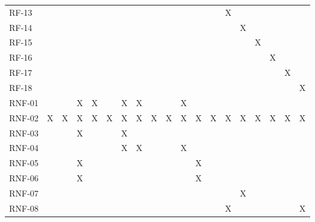 \begin{table}[H]
\begin{tabular}{@{}lC{0.42cm}C{0.42cm}C{0.42cm}C{0.42cm}C{0.42cm}C{0.42cm}C{0.42cm}C{0.42cm}C{0.42cm}C{0.42cm}C{0.42cm}C{0.42cm}C{0.42cm}C{0.42cm}C{0.42cm}C{0.42cm}C{0.42cm}C{0.42cm}@{}}
RF-13 &  &  &  &  &  &  &  &  &  &  &  &  & X &  &  &  &  &  \\
RF-14 &  &  &  &  &  &  &  &  &  &  &  &  &  & X &  &  &  &  \\
RF-15 &  &  &  &  &  &  &  &  &  &  &  &  &  &  & X &  &  &  \\
RF-16 &  &  &  &  &  &  &  &  &  &  &  &  &  &  &  & X &  &  \\
RF-17 &  &  &  &  &  &  &  &  &  &  &  &  &  &  &  &  & X &  \\
RF-18 &  &  &  &  &  &  &  &  &  &  &  &  &  &  &  &  &  & X \\
\midrule
RNF-01 &  &  & X & X &  & X & X &  &  & X &  &  &  &  &  &  &  &  \\
RNF-02 & X & X & X & X & X & X & X & X & X & X & X & X & X & X & X & X & X & X \\
RNF-03 &  &  & X &  &  & X &  &  &  &  &  &  &  &  &  &  &  &  \\
RNF-04 &  &  &  &  &  & X & X &  &  & X &  &  &  &  &  &  &  &  \\
RNF-05 &  &  & X &  &  &  &  &  &  &  & X &  &  &  &  &  &  &  \\
RNF-06 &  &  & X &  &  &  &  &  &  &  & X &  &  &  &  &  &  &  \\
RNF-07 &  &  &  &  &  &  &  &  &  &  &  &  &  & X &  &  &  &  \\
RNF-08 &  &  &  &  &  &  &  &  &  &  &  &  & X &  &  &  &  & X \\
\bottomrule
\end{tabular}
\end{table}
